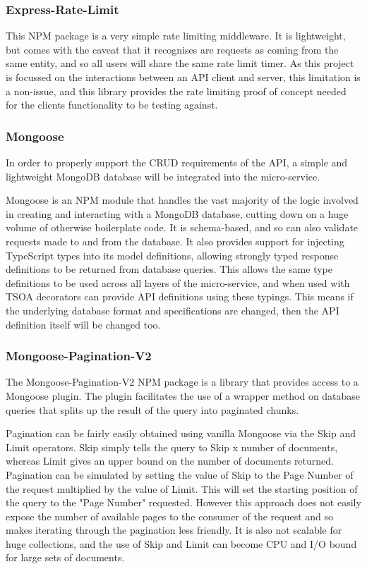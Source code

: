 \subsubsection{Express-Rate-Limit}
This NPM package is a very simple rate limiting middleware. It is lightweight, but comes with the caveat that it recognises are requests as coming from  the same entity, and so all users will share the same rate limit timer. As this project is focussed on the interactions between an API client and server, this limitation is a non-issue, and this library provides the rate limiting proof of concept needed for the clients functionality to be testing against.
\subsubsection{Mongoose}
In order to properly support the CRUD requirements of the API, a simple and lightweight MongoDB database will be integrated into the micro-service.

Mongoose is an NPM module that handles the vast majority of the logic involved in creating and interacting with a MongoDB database, cutting down on a huge volume of otherwise boilerplate code. It is schema-based, and so can also validate requests made to and from the database. It also provides support for injecting TypeScript types into its model definitions, allowing strongly typed response definitions to be returned from database queries. This allows the same type definitions to be used across all layers of the micro-service, and when used with TSOA decorators can provide API definitions using these typings. This means if the underlying database format and specifications are changed, then the API definition itself will be changed too.
\subsubsection{Mongoose-Pagination-V2}
The Mongoose-Pagination-V2 NPM package is a library that provides access to a Mongoose plugin. The plugin facilitates the use of a wrapper method on database queries that splits up the result of the query into paginated chunks.

Pagination can be fairly easily obtained using vanilla Mongoose via the Skip and Limit operators. Skip simply tells the query to Skip x number of documents, whereas Limit gives an upper bound on the number of documents returned. Pagination can be simulated by setting the value of Skip to the Page Number of the request multiplied by the value of Limit. This will set the starting position of the query to the "Page Number" requested. However this approach does not easily expose the number of available pages to the consumer of the request and so makes iterating through the pagination less friendly. It is also not scalable for huge collections, and the use of Skip and Limit can become CPU and I/O bound for large sets of documents.

